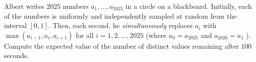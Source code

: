Albert writes $2025$ numbers $a_{1}, \ldots, a_{2025}$ in a circle on a blackboard. Initially, each of the numbers is uniformly and independently sampled at random from the interval $[0,1]$. Then, each second, he \emph{simultaneously} replaces $a_{i}$ with $\max \left(a_{i-1}, a_{i}, a_{i+1}\right)$ for all $i=1,2, \ldots, 2025$ (where $a_{0}=a_{2025}$ and $a_{2026}=a_{1}$ ). Compute the expected value of the number of distinct values remaining after $100$ seconds.